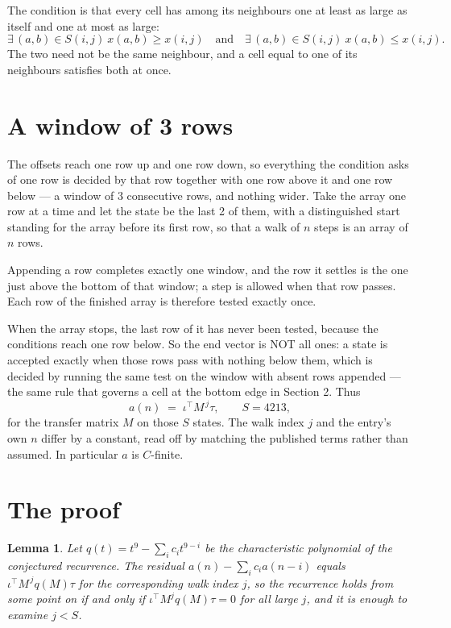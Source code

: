 \documentclass[11pt,a4paper]{article}
\theoremstyle{plain}
\newtheorem{lemma}[theorem]{Lemma}
\theoremstyle{definition}
\begin{document}
The condition is that every cell has among its neighbours one at least as large as itself and one at most as large:
\[
\exists\,(a,b)\in S(i,j)\ x(a,b)\ge x(i,j)\quad\text{and}\quad\exists\,(a,b)\in S(i,j)\ x(a,b)\le x(i,j).
\]
The two need not be the same neighbour, and a cell equal to one of its neighbours satisfies both at once.

\section{A window of 3 rows}

The offsets reach one row up and one row down, so everything the condition asks of one row is
decided by that row together with one row above it and one row below --- a window of
$3$ consecutive rows, and nothing wider. Take the array one row at a time and
let the state be the last 2 of them, with a distinguished start standing for the array before its
first row, so that a walk of $n$ steps is an array of $n$ rows.

Appending a row completes exactly one window, and the row it settles is the one just above the bottom of that window; a step is
allowed when that row passes. Each row of the finished array is therefore tested exactly once.

When the array stops, the last row of it has never been tested, because the
conditions reach one row below. So the end vector is NOT all ones: a state is accepted exactly when
those rows pass with nothing below them, which is decided by running the same test on the window
with absent rows appended --- the same rule that governs a cell at the bottom edge in
Section 2.
Thus
\[
a(n)\;=\;\iota^{\!\top}M^{\,j}\tau ,\qquad S=4213,
\]
for the transfer matrix $M$ on those $S$ states. The walk index $j$ and the entry's own $n$
differ by a constant, read off by matching the published terms rather than assumed. In
particular $a$ is $C$-finite.

\section{The proof}

\begin{lemma}\label{lem:crit}
Let $q(t)=t^{9}-\sum_i c_it^{9-i}$ be the characteristic polynomial of the
conjectured recurrence. The residual $a(n)-\sum_ic_ia(n-i)$ equals
$\iota^{\!\top}M^{\,j}q(M)\tau$ for the corresponding walk index $j$, so the recurrence
holds from some point on if and only if $\iota^{\!\top}M^{j}q(M)\tau=0$ for all large $j$,
and it is enough to examine $j<S$.
\end{lemma}
\end{document}
